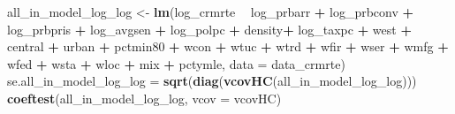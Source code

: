 \documentclass[
]{article}
\newenvironment{Shaded}{\begin{snugshade}}{\end{snugshade}}
\newcommand{\DataTypeTok}[1]{\textcolor[rgb]{0.13,0.29,0.53}{#1}}
\newcommand{\KeywordTok}[1]{\textcolor[rgb]{0.13,0.29,0.53}{\textbf{#1}}}
\newcommand{\NormalTok}[1]{#1}
\newcommand{\OperatorTok}[1]{\textcolor[rgb]{0.81,0.36,0.00}{\textbf{#1}}}
\newcommand{\StringTok}[1]{\textcolor[rgb]{0.31,0.60,0.02}{#1}}
\begin{document}
\begin{Shaded}
\begin{Highlighting}[]
\NormalTok{all_in_model_log_log <-}\StringTok{ }\KeywordTok{lm}\NormalTok{(log_crmrte }\OperatorTok{~}\StringTok{ }\NormalTok{log_prbarr }\OperatorTok{+}\StringTok{ }\NormalTok{log_prbconv }
                             \OperatorTok{+}\StringTok{ }\NormalTok{log_prbpris }\OperatorTok{+}\StringTok{ }\NormalTok{log_avgsen }\OperatorTok{+}\StringTok{ }\NormalTok{log_polpc}
                             \OperatorTok{+}\StringTok{ }\NormalTok{density}\OperatorTok{+}\StringTok{ }\NormalTok{log_taxpc }\OperatorTok{+}\StringTok{ }\NormalTok{west }\OperatorTok{+}\StringTok{ }\NormalTok{central }
                             \OperatorTok{+}\StringTok{ }\NormalTok{urban }\OperatorTok{+}\StringTok{ }\NormalTok{pctmin80 }\OperatorTok{+}\StringTok{ }\NormalTok{wcon}
                             \OperatorTok{+}\StringTok{ }\NormalTok{wtuc }\OperatorTok{+}\StringTok{ }\NormalTok{wtrd }\OperatorTok{+}\StringTok{ }\NormalTok{wfir }
                             \OperatorTok{+}\StringTok{ }\NormalTok{wser }\OperatorTok{+}\StringTok{ }\NormalTok{wmfg }\OperatorTok{+}\StringTok{ }\NormalTok{wfed }\OperatorTok{+}\StringTok{ }\NormalTok{wsta }\OperatorTok{+}\StringTok{ }\NormalTok{wloc}
                             \OperatorTok{+}\StringTok{ }\NormalTok{mix }\OperatorTok{+}\StringTok{ }\NormalTok{pctymle,}
                             \DataTypeTok{data =}\NormalTok{ data_crmrte)}
\NormalTok{se.all_in_model_log_log =}\StringTok{ }\KeywordTok{sqrt}\NormalTok{(}\KeywordTok{diag}\NormalTok{(}\KeywordTok{vcovHC}\NormalTok{(all_in_model_log_log)))}
\KeywordTok{coeftest}\NormalTok{(all_in_model_log_log, }\DataTypeTok{vcov =}\NormalTok{ vcovHC)}
\end{Highlighting}
\end{Shaded}
\end{document}

